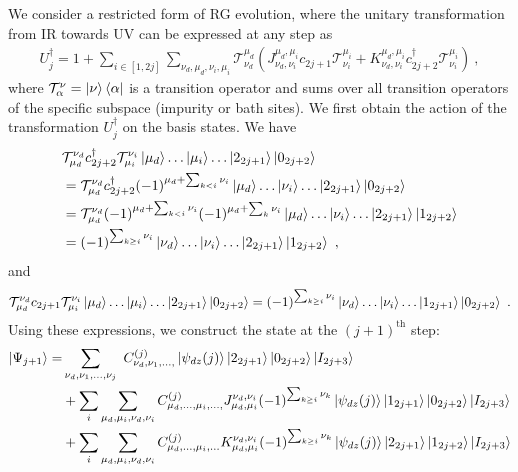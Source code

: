 We consider a restricted form of RG evolution, where the unitary transformation from IR towards UV can be expressed at any step as
\begin{equation}\begin{aligned}
	U_j^\dagger = 1 + \sum_{i \in [1, 2j]}\sum_{\nu_d,\mu_d,\nu_i,\mu_i}\mathcal{T}^{\mu_d}_{\nu_d}(J^{\mu_d,\mu_i}_{\nu_d,\nu_i} c_{2j+1}\mathcal{T}^{\mu_i}_{\nu_i}  + K^{\mu_d,\mu_i}_{\nu_d,\nu_i} c_{2j+2}^\dagger\mathcal{T}^{\mu_i}_{\nu_i})~,
\end{aligned}\end{equation}
where \(\mathcal{T}^\nu_\alpha = \ket{\nu}\bra{\alpha}\) is a transition operator and sums over all transition operators of the specific subspace (impurity or bath sites). We first obtain the action of the transformation \(U_j^\dagger\) on the basis states. We have
\begin{equation}\begin{aligned}
	&\mathcal{T}^{\nu_d}_{\mu_d} c^\dagger_{2j+2} \mathcal{T}^{\nu_i}_{\mu_i}\ket{\mu_d}\ldots\ket{\mu_i}\ldots\ket{2_{2j+1}}\ket{0_{2j+2}}\\
	&=\mathcal{T}^{\nu_d}_{\mu_d} c^\dagger_{2j+2} (-1)^{\mu_d + \sum_{k < i}\nu_i} \ket{\mu_d}\ldots\ket{\nu_i}\ldots\ket{2_{2j+1}}\ket{0_{2j+2}}\\ 
	&=\mathcal{T}^{\nu_d}_{\mu_d} (-1)^{\mu_d + \sum_{k < i}\nu_i} (-1)^{\mu_d + \sum_{k}\nu_i}\ket{\mu_d}\ldots\ket{\nu_i}\ldots\ket{2_{2j+1}}\ket{1_{2j+2}}\\ 
	&=(-1)^{\sum_{k \geq i}\nu_i}\ket{\nu_d}\ldots\ket{\nu_i}\ldots\ket{2_{2j+1}}\ket{1_{2j+2}}~,
\end{aligned}\end{equation}
and
\begin{equation}\begin{aligned}
	\mathcal{T}^{\nu_d}_{\mu_d} c_{2j+1} \mathcal{T}^{\nu_i}_{\mu_i}\ket{\mu_d}\ldots\ket{\mu_i}\ldots\ket{2_{2j+1}}\ket{0_{2j+2}} =(-1)^{\sum_{k \geq i}\nu_i}\ket{\nu_d}\ldots\ket{\nu_i}\ldots\ket{1_{2j+1}}\ket{0_{2j+2}}~.
\end{aligned}\end{equation}
Using these expressions, we construct the state at the \((j+1)^\text{th}\) step:
\begin{equation}\begin{aligned}
	\ket{\Psi_{j+1}} =& \sum_{\nu_d,\nu_1,\ldots,\nu_j}~C^{(j)}_{\nu_d,\nu_1,\ldots,}\ket{\psi_{dz}(j)}\ket{2_{2j+1}}\ket{0_{2j+2}}\ket{I_{2j+3}} \\
					  &+ \sum_i\sum_{\mu_d,\mu_i,\nu_d,\nu_i}C^{(j)}_{\mu_d,\ldots,\mu_i,\ldots,}J^{\nu_d,\nu_i}_{\mu_d,\mu_i}(-1)^{\sum_{k\geq i}\nu_k}\ket{\psi_{dz}(j)}\ket{1_{2j+1}}\ket{0_{2j+2}}\ket{I_{2j+3}} \\
					  &+ \sum_i\sum_{\mu_d,\mu_i,\nu_d,\nu_i}C^{(j)}_{\mu_d,\ldots,\mu_i,\ldots}K^{\nu_d,\nu_i}_{\mu_d,\mu_i}(-1)^{\sum_{k\geq i}\nu_k}\ket{\psi_{dz}(j)}\ket{2_{2j+1}}\ket{1_{2j+2}}\ket{I_{2j+3}} \\
\end{aligned}\end{equation}
